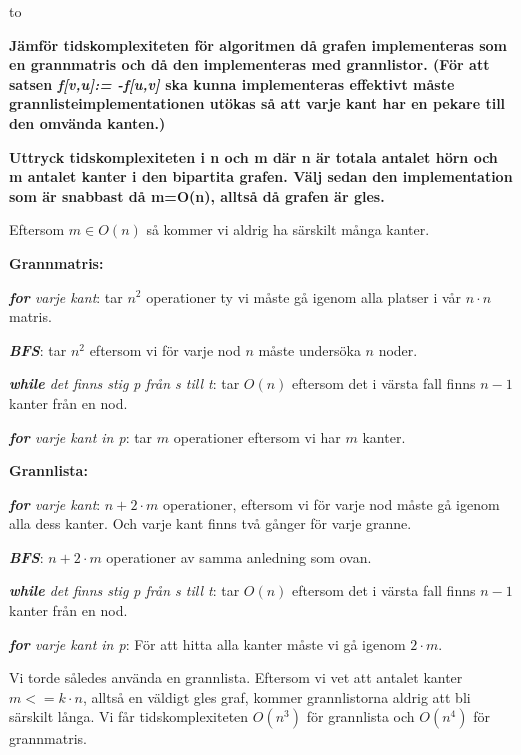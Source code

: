 \documentclass[11pt]{exam}
\begin{document}
\lstset{language=Python,numbers=left}

\vspace{0.1in} 
\hbox to \textwidth{Name:\enspace\hrulefill} 

\begin{questions}

\question \textbf{	
	Jämför tidskomplexiteten för algoritmen då grafen implementeras som en grannmatris och då den implementeras med grannlistor. (För att satsen \textit{f[v,u]:= -f[u,v]} ska kunna implementeras effektivt måste grannlisteimplementationen utökas så att varje kant har en pekare till den omvända kanten.)}

\textbf{	Uttryck tidskomplexiteten i n och m där n är totala antalet hörn och m antalet kanter i den bipartita grafen. Välj sedan den implementation som är snabbast då m=O(n), alltså då grafen är gles.}

Eftersom $m \in O(n)$ så kommer vi aldrig ha särskilt många kanter. 

\textbf{Grannmatris:}
\newline

\textit{\textbf{for} varje kant}: tar $n^2$ operationer ty vi måste gå igenom alla platser i vår $n \cdot n$ matris.

\textit{\textbf{BFS}}: tar $n^2$ eftersom vi för varje nod $n$ måste undersöka $n$ noder.

\textit{\textbf{while} det finns stig p från s till t}: tar $O(n)$ eftersom det i värsta fall finns $n-1$ kanter från en nod.

\textit{\textbf{for} varje kant in p}: tar $m$ operationer eftersom vi har $m$ kanter.
\newline

\textbf{Grannlista:}

\textit{\textbf{for} varje kant}: $n + 2 \cdot m$ operationer, eftersom vi för varje nod måste gå igenom alla dess kanter. Och varje kant finns två gånger för varje granne.

\textit{\textbf{BFS}}: $n + 2\cdot m$ operationer av samma anledning som ovan.

\textit{\textbf{while} det finns stig p från s till t}: tar $O(n)$ eftersom det i värsta fall finns $n-1$ kanter från en nod.

\textit{\textbf{for} varje kant in p}: För att hitta alla kanter måste vi gå igenom $2\cdot m$.

Vi torde således använda en grannlista. Eftersom vi vet att antalet kanter $m <= k \cdot n$, alltså en väldigt gles graf, kommer grannlistorna aldrig att bli särskilt långa. Vi får tidskomplexiteten $O(n^3)$ för grannlista och $O(n^4)$ för grannmatris.


\end{questions}
\end{document}
